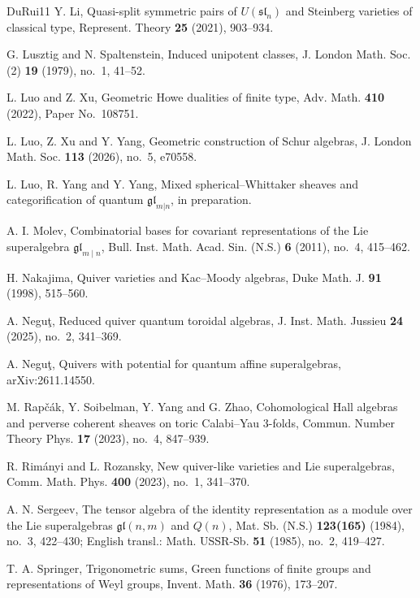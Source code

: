 \documentclass[11pt,a4paper]{amsart}
\theoremstyle{definition}
\theoremstyle{remark}
\numberwithin{equation}{section}
\begin{document}
\begin{thebibliography}{DuRui11}
Y. Li,
Quasi-split symmetric pairs of $U(\mathfrak{sl}_n)$ and Steinberg varieties
of classical type,
Represent. Theory \textbf{25} (2021), 903--934.

G. Lusztig and N. Spaltenstein,
Induced unipotent classes,
J. London Math. Soc. (2) \textbf{19} (1979), no.~1, 41--52.

L. Luo and Z. Xu,
Geometric Howe dualities of finite type,
Adv. Math. \textbf{410} (2022), Paper No.~108751.

L. Luo, Z. Xu and Y. Yang,
Geometric construction of Schur algebras,
J. London Math. Soc. \textbf{113} (2026), no.~5, e70558.

L. Luo, R. Yang and Y. Yang,
Mixed spherical--Whittaker sheaves and categorification of quantum
$\mathfrak{gl}_{m|n}$, in preparation.

A. I. Molev,
Combinatorial bases for covariant representations of the
Lie superalgebra $\mathfrak{gl}_{m\mid n}$,
Bull. Inst. Math. Acad. Sin. (N.S.) \textbf{6} (2011), no.~4, 415--462.

H. Nakajima, Quiver varieties and Kac--Moody algebras,
Duke Math. J. \textbf{91} (1998), 515--560.

A. Negu\c{t},
Reduced quiver quantum toroidal algebras,
J. Inst. Math. Jussieu \textbf{24} (2025), no.~2, 341--369.

A. Negu\c{t},
Quivers with potential for quantum affine superalgebras,
arXiv:2611.14550.

M. Rap\v{c}\'ak, Y. Soibelman, Y. Yang and G. Zhao,
Cohomological Hall algebras and perverse coherent sheaves on toric
Calabi--Yau 3-folds,
Commun. Number Theory Phys. \textbf{17} (2023), no.~4, 847--939.

R. Rim\'anyi and L. Rozansky,
New quiver-like varieties and Lie superalgebras,
Comm. Math. Phys. \textbf{400} (2023), no.~1, 341--370.

A. N. Sergeev,
The tensor algebra of the identity representation as a module over the
Lie superalgebras $\mathfrak{gl}(n,m)$ and $Q(n)$,
Mat. Sb. (N.S.) \textbf{123(165)} (1984), no.~3, 422--430; English transl.: Math. USSR-Sb. \textbf{51} (1985), no.~2, 419--427.

T. A. Springer,
Trigonometric sums, Green functions of finite groups and representations
of Weyl groups,
Invent. Math. \textbf{36} (1976), 173--207.


\end{thebibliography}
\end{document}
